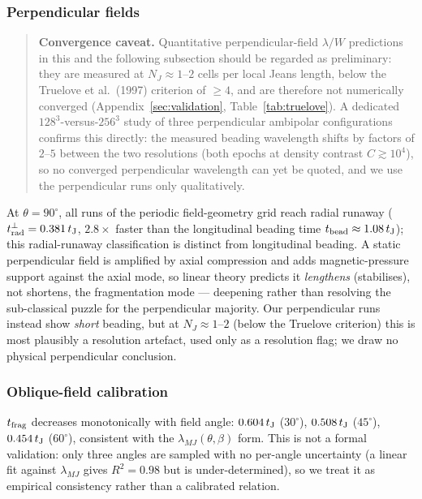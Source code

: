 \documentclass[usenatbib,twoside,twocolumn]{mnras}
\begin{document}
\subsubsection{Perpendicular fields}

\begin{quote}\sloppy\small
\textbf{Convergence caveat.} Quantitative perpendicular-field $\lambda/W$ predictions in this and the following subsection should be regarded as preliminary: they are measured at $N_J\approx1$--$2$ cells per local Jeans length, below the Truelove et al.\ (1997) criterion of $\geq4$, and are therefore not numerically converged (Appendix~\ref{sec:validation}, Table~\ref{tab:truelove}). A dedicated $128^3$-versus-$256^3$ study of three perpendicular ambipolar configurations confirms this directly: the measured beading wavelength shifts by factors of $2$--$5$ between the two resolutions (both epochs at density contrast $C\gtrsim10^4$), so no converged perpendicular wavelength can yet be quoted, and we use the perpendicular runs only qualitatively.
\end{quote}

At $\theta=90^\circ$, all runs of the periodic field-geometry grid reach radial runaway ($t_{\rm rad}^{\perp}=0.381\,t_{\rm J}$, $2.8\times$ faster than the longitudinal beading time $t_{\rm bead}\approx1.08\,t_{\rm J}$); this radial-runaway classification is distinct from longitudinal beading. A static perpendicular field is amplified by axial compression and adds magnetic-pressure support against the axial mode, so linear theory \citep{Nagasawa1987,Nakamura1993} predicts it \emph{lengthens} (stabilises), not shortens, the fragmentation mode --- deepening rather than resolving the sub-classical puzzle for the perpendicular majority. Our perpendicular runs instead show \emph{short} beading, but at $N_J\approx1$--$2$ (below the Truelove criterion) this is most plausibly a resolution artefact, used only as a resolution flag; we draw no physical perpendicular conclusion.

\subsubsection{Oblique-field calibration}
$t_{\rm frag}$ decreases monotonically with field angle: $0.604\,t_{\rm J}$ ($30^\circ$), $0.508\,t_{\rm J}$ ($45^\circ$), $0.454\,t_{\rm J}$ ($60^\circ$), consistent with the $\lambda_{MJ}(\theta,\beta)$ form. This is not a formal validation: only three angles are sampled with no per-angle uncertainty (a linear fit against $\lambda_{MJ}$ gives $R^2=0.98$ but is under-determined), so we treat it as empirical consistency rather than a calibrated relation.
\end{document}
